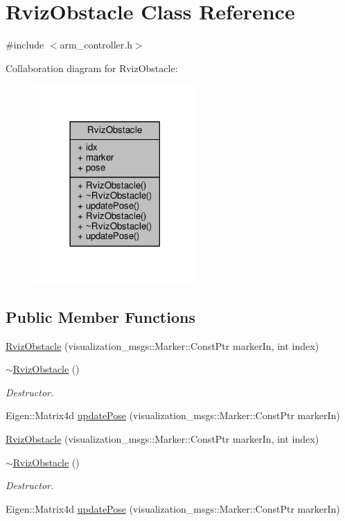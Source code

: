 \hypertarget{class_rviz_obstacle}{}\section{Rviz\+Obstacle Class Reference}
\label{class_rviz_obstacle}


{\ttfamily \#include $<$arm\+\_\+controller.\+h$>$}



Collaboration diagram for Rviz\+Obstacle\+:
\nopagebreak
\begin{figure}[H]
\begin{center}
\leavevmode
\includegraphics[width=177pt]{class_rviz_obstacle__coll__graph}
\end{center}
\end{figure}
\subsection*{Public Member Functions}
\begin{DoxyCompactItemize}
\item 
\hyperlink{class_rviz_obstacle_a3fb19f60434581b669c0dc063c026943}{Rviz\+Obstacle} (visualization\+\_\+msgs\+::\+Marker\+::\+Const\+Ptr marker\+In, int index)
\item 
\hyperlink{class_rviz_obstacle_aefa092d8dcad532408308c34cb4cddbe}{$\sim$\+Rviz\+Obstacle} ()
\begin{DoxyCompactList}\small\item\em Destructor. \end{DoxyCompactList}\item 
Eigen\+::\+Matrix4d \hyperlink{class_rviz_obstacle_a30101e2a3c65776bb4abbb139f10b14a}{update\+Pose} (visualization\+\_\+msgs\+::\+Marker\+::\+Const\+Ptr marker\+In)
\item 
\hyperlink{class_rviz_obstacle_a3fb19f60434581b669c0dc063c026943}{Rviz\+Obstacle} (visualization\+\_\+msgs\+::\+Marker\+::\+Const\+Ptr marker\+In, int index)
\item 
\hyperlink{class_rviz_obstacle_aefa092d8dcad532408308c34cb4cddbe}{$\sim$\+Rviz\+Obstacle} ()
\begin{DoxyCompactList}\small\item\em Destructor. \end{DoxyCompactList}\item 
Eigen\+::\+Matrix4d \hyperlink{class_rviz_obstacle_a30101e2a3c65776bb4abbb139f10b14a}{update\+Pose} (visualization\+\_\+msgs\+::\+Marker\+::\+Const\+Ptr marker\+In)
\end{DoxyCompactItemize}
